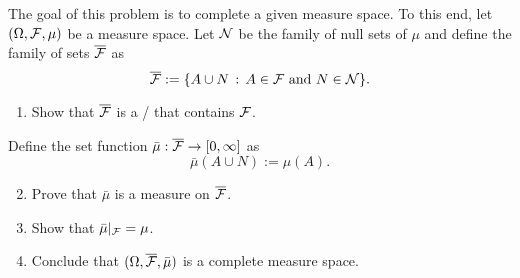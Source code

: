 \begin{problem}\label{prb:completion_measure_space}
The goal of this problem is to complete a given measure space. To this end, let $(\Omega, \mathcal F, \mu)$ be a measure space. Let $\mathcal N$ be the family of null sets of $\mu$ and define the family of sets $\overline{\mathcal F}$ as
\[
	\overline{\mathcal F} := \{A \cup N \, : \, A \in \mathcal F \text{ and } N \in \mathcal N\}.
\]
\begin{enumerate}
\item Show that $\overline{\mathcal F}$ is a \sigalg/ that contains $\mathcal F$.
\end{enumerate}
Define the set function $\bar{\mu} : \overline{\mathcal F} \to [0,\infty]$ as
\[
	\bar{\mu}(A \cup N) := \mu(A).
\]
\begin{enumerate}
\setcounter{enumi}{1}
\item Prove that $\bar{\mu}$ is a measure on $\overline{\mathcal F}$.
\item Show that $\bar{\mu}|_{\mathcal F} = \mu$.
\item Conclude that $(\Omega, \overline{\mathcal F}, \bar{\mu})$ is a complete measure space.
\end{enumerate}
\end{problem}


